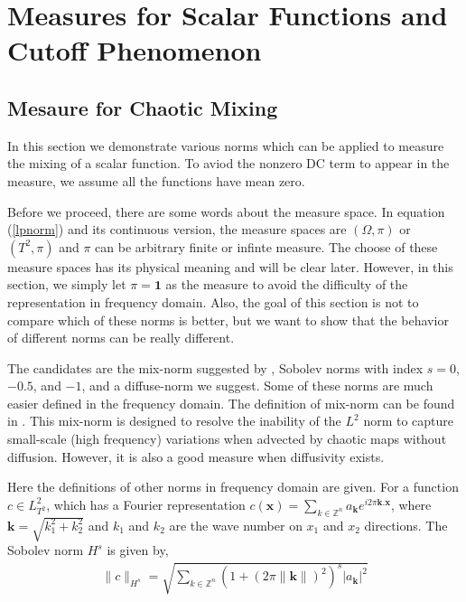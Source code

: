 \documentclass{article}
\begin{document}
\section{Measures for Scalar Functions and Cutoff Phenomenon}
\label{Measure for Scalar Functions}
\subsection{Mesaure for Chaotic Mixing}
In this section we demonstrate various norms which can be applied to measure the mixing of a scalar function. To aviod the nonzero DC term to appear in the measure, we assume all the functions have mean zero. 

Before we proceed, there are some words about the measure space. In equation (\ref{lpnorm}) and its continuous version, the measure spaces are $(\Omega, \pi)$ or $(T^2,\pi)$ and $\pi$ can be arbitrary finite or infinte measure. The choose of these measure spaces has its physical meaning and will be clear later. However, in this section, we simply let $\pi = \mathbf{1}$ as the measure to avoid the difficulty of the representation in frequency domain. Also, the goal of this section is not to compare which of these norms is better, but we want to show that the behavior of different norms can be really different. 

The candidates are the mix-norm suggested by \cite{Mezic2005}, Sobolev norms with index $s= 0$,$-0.5$, and $-1$, and a diffuse-norm we suggest. Some of these norms are much easier defined in the frequency domain. The definition of mix-norm can be found in \cite{Mezic2005}. This mix-norm is designed to resolve the inability of the $L^2$ norm to capture small-scale
(high frequency) variations when advected by chaotic maps without diffusion. However, it is also a good measure when diffusivity exists.  

 
Here the definitions of other norms in frequency domain are given. For a function $c \in L^{2}_{T^2}$, which has a Fourier representation $c(\mathbf{x}) = \sum_{k \in \mathbb{Z}^n} a_\mathbf{k} e^{i 2 \pi \mathbf{k.x}}$, where $\mathbf{k}=\sqrt{k_1^2+k_2^2}$ and $k_1$ and $k_2$ are the wave number on $x_1$ and $x_2$ directions. The Sobolev norm $H^s$ is given by,
\begin{eqnarray}
  \|c\|_{H^s} = \sqrt{\sum_{k \in \mathbb{Z}^n}   \left(1+(2 \pi \|\mathbf{k}\|)^2\right)^s |a_{\mathbf{k}} |^2   }
\end{eqnarray}
\end{document}
